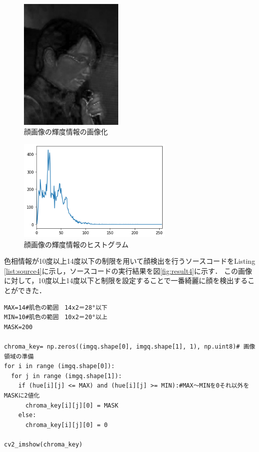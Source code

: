\documentclass[uplatex]{jsarticle}
\begin{document}
\begin{figure}[htbp]
  \begin{center}
    \includegraphics[clip,width=5.0cm]{figures/result3-3.png}
    \caption{顔画像の輝度情報の画像化}
    \label{fig:result3-3}
  \end{center}
\end{figure}

\begin{figure}[htbp]
  \begin{center}
    \includegraphics[clip,width=7.5cm]{figures/result3-4.png}
    \caption{顔画像の輝度情報のヒストグラム}
    \label{fig:result3-4}
  \end{center}
\end{figure}


色相情報が10度以上14度以下の制限を用いて顔検出を行うソースコードをListing \ref{list:source4}に示し，ソースコードの実行結果を図\ref{fig:result4}に示す．
この画像に対して，10度以上14度以下と制限を設定することで一番綺麗に顔を検出することができた．
\begin{lstlisting}[caption=色相による顔検出,label=list:source4]
MAX=14#肌色の範囲　14x2＝28°以下
MIN=10#肌色の範囲　10x2＝20°以上
MASK=200

chroma_key= np.zeros((imgq.shape[0], imgq.shape[1], 1), np.uint8)# 画像領域の準備
for i in range (imgq.shape[0]):
  for j in range (imgq.shape[1]):
    if (hue[i][j] <= MAX) and (hue[i][j] >= MIN):#MAX〜MINを0それ以外をMASKに2値化
      chroma_key[i][j][0] = MASK
    else:
      chroma_key[i][j][0] = 0

cv2_imshow(chroma_key)
\end{lstlisting}
\end{document}
